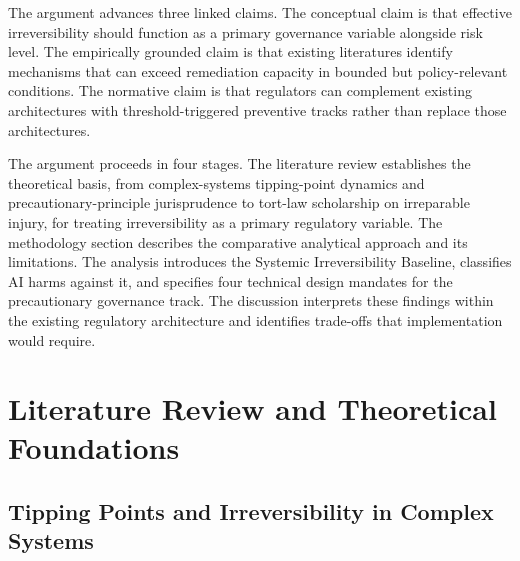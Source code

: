 \documentclass[11pt]{article}
\begin{document}
The argument advances three linked claims. The conceptual claim is that effective irreversibility should function as a primary governance variable alongside risk level. The empirically grounded claim is that existing literatures identify mechanisms that can exceed remediation capacity in bounded but policy-relevant conditions. The normative claim is that regulators can complement existing architectures with threshold-triggered preventive tracks rather than replace those architectures.

The argument proceeds in four stages. The literature review establishes the theoretical basis, from complex-systems tipping-point dynamics and precautionary-principle jurisprudence to tort-law scholarship on irreparable injury, for treating irreversibility as a primary regulatory variable. The methodology section describes the comparative analytical approach and its limitations. The analysis introduces the Systemic Irreversibility Baseline, classifies AI harms against it, and specifies four technical design mandates for the precautionary governance track. The discussion interprets these findings within the existing regulatory architecture and identifies trade-offs that implementation would require.

\section{Literature Review and Theoretical Foundations}


\subsection{Tipping Points and Irreversibility in Complex Systems}
\end{document}
